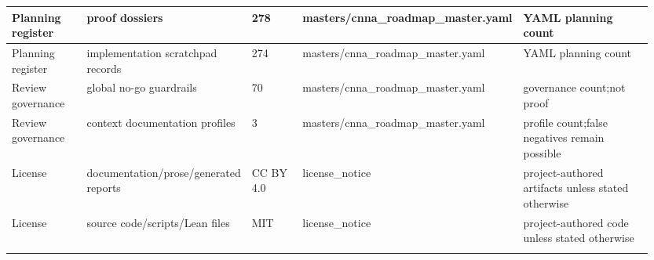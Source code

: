 \begin{longtable}{L{0.13\linewidth} L{0.205\linewidth} L{0.1\linewidth} L{0.235\linewidth} L{0.285\linewidth}}
\hline
\addlinespace[0.24em]
Planning register & proof dossiers & 278 & masters/\allowbreak{}cnna\_roadmap\_master.yaml & YAML planning count\\
\hline
\addlinespace[0.24em]
Planning register & implementation scratchpad records & 274 & masters/\allowbreak{}cnna\_roadmap\_master.yaml & YAML planning count\\
\hline
\addlinespace[0.24em]
Review governance & global no-go guardrails & 70 & masters/\allowbreak{}cnna\_roadmap\_master.yaml & governance count;\newline not proof\\
\hline
\addlinespace[0.24em]
Review governance & context documentation profiles & 3 & masters/\allowbreak{}cnna\_roadmap\_master.yaml & profile count;\newline false negatives remain possible\\
\hline
\addlinespace[0.24em]
License & documentation/\allowbreak{}prose/\allowbreak{}generated reports & CC BY 4.0 & license\_notice & project-authored artifacts unless stated otherwise\\
\hline
\addlinespace[0.24em]
License & source code/\allowbreak{}scripts/\allowbreak{}Lean files & MIT & license\_notice & project-authored code unless stated otherwise\\
\hline
\addlinespace[0.24em]
\end{longtable}
\normalsize
